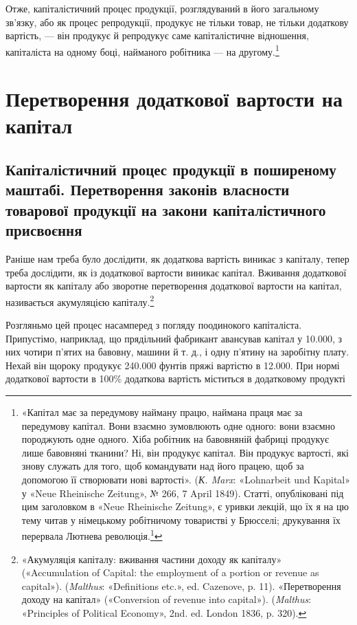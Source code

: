 Отже, капіталістичний процес продукції, розглядуваний в
його загальному зв’язку, або як процес репродукції, продукує
не тільки товар, не тільки додаткову вартість, — він продукує
й репродукує саме капіталістичне відношення, капіталіста на
одному боці, найманого робітника — на другому.\footnote{
«Капітал має за передумову найману працю, наймана праця має за передумову
капітал. Вони взаємно зумовлюють одне одного: вони взаємно породжують одне
одного. Хіба робітник на бавовняній фабриці
продукує лише бавовняні тканини? Ні, він продукує капітал. Він продукує
вартості, які знову служать для того, щоб командувати над його працею, щоб за
допомогою її створювати нові вартості». (\emph{К. Marx}:
«Lohnarbeit und Kapital» у «Neue Rheinische Zeitung», № 266, 7 April 1849).
Статті, опубліковані під цим заголовком в «Neue Rheinische Zeitung», є уривки
лекцій, що їх я на цю тему читав у німецькому
робітничому товаристві у Брюсселі; друкування їх перервала Лютнева
революція.\footnote*{
Статті ці з’явилися потім окремою брошурою і під тією ж назвою.
Є українське видання: Партвидав «Пролетар» 1932 р. \emph{Ред.}
}
}

\section{Перетворення додаткової вартости на капітал}

\subsection{Капіталістичний процес продукції в поширеному маштабі.
Перетворення законів власности товарової продукції на закони
капіталістичного присвоєння}

Раніше нам треба було дослідити, як додаткова вартість виникає
з капіталу, тепер треба дослідити, як із додаткової вартости
виникає капітал. Вживання додаткової вартости як капіталу
або зворотне перетворення додаткової вартости на капітал, називається
акумуляцією капіталу.\footnote{
«Акумуляція капіталу: вживання частини доходу як капіталу» («Accumulation of
Capital: the employment of a portion or revenue as capital»). (\emph{Malthus}:
«Definitions etc.», ed. Cazenove, p. 11).
«Перетворення доходу на капітал» («Conversion of revenue into capital»).
(\emph{Malthus}: «Principles of Political Economy», 2nd. ed. London 1836, p. 320).
}

Розгляньмо цей процес насамперед з погляду поодинокого капіталіста. Припустімо,
наприклад, що прядільний фабрикант авансував капітал у 10.000,
з них чотири п’ятих на бавовну, машини й т. д., і одну п’ятину на заробітну
плату. Нехай він щороку продукує 240.000 фунтів пряжі
вартістю в 12.000. При нормі додаткової вартости в 100\%
додаткова вартість міститься в додатковому продукті
\parbreak{}  %
